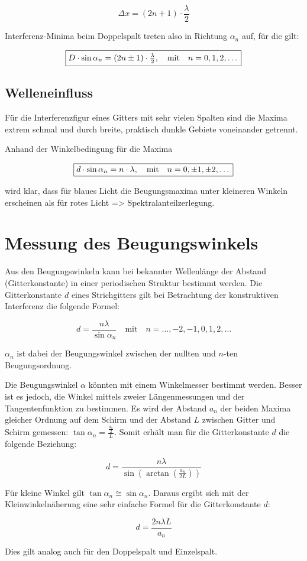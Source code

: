        $$\Delta x = (2n + 1) \cdot \frac{\lambda}{2}$$
        
        Interferenz-Minima beim Doppelspalt treten also in Richtung $\alpha_{n}$ auf, für die gilt:
        
        $$\fbox{$D \cdot \sin \alpha_{n} = (2n \pm 1) \cdot \frac{\lambda}{2}, \quad \text{mit} \quad n = 0, 1, 2, \dots$}$$
    
    \subsection{Welleneinfluss}

        Für die Interferenzfigur eines Gitters mit sehr vielen Spalten sind die Maxima extrem schmal und durch breite, praktisch dunkle Gebiete voneinander getrennt.

        Anhand der Winkelbedingung für die Maxima
        
        $$\fbox{$d \cdot \sin \alpha_{n} = n \cdot \lambda, \quad \text{mit} \quad n = 0, \pm 1, \pm 2, \dots$}$$
        
        wird klar, dass für blaues Licht die Beugungsmaxima unter kleineren Winkeln erscheinen als für rotes Licht => Spektralanteilzerlegung.

\section{Messung des Beugungswinkels}

    Aus den Beugungswinkeln kann bei bekannter Wellenlänge der Abstand (Gitterkonstante) in einer periodischen Struktur bestimmt werden. Die Gitterkonstante $d$ eines Strichgitters gilt bei Betrachtung der konstruktiven Interferenz die folgende Formel:

    $$d = \frac{n \lambda}{\sin \alpha_{n}} \quad \text{mit} \quad n = \dots, -2, -1, 0, 1, 2, \dots$$

    $\alpha_{n}$ ist dabei der Beugungswinkel zwischen der nullten und $n$-ten Beugungsordnung.

    Die Beugungswinkel $\alpha$ könnten mit einem Winkelmesser bestimmt werden. Besser ist es jedoch, die Winkel mittels zweier Längenmessungen und der Tangentenfunktion zu bestimmen. Es wird der Abstand $a_{n}$ der beiden Maxima gleicher Ordnung auf dem Schirm und der Abstand $L$ zwischen Gitter und Schirm gemessen: $\tan \alpha_{n} = \frac{\frac{a_{n}}{2}}{L}$. Somit erhält man für die Gitterkonstante $d$ die folgende Beziehung:

    $$d = \frac{n \lambda}{\sin \left(\arctan\left(\frac{a_{n}}{2 L}\right)\right)}$$

    Für kleine Winkel gilt $\tan \alpha_{n} \cong \sin \alpha_{n}$. Daraus ergibt sich mit der Kleinwinkelnäherung eine sehr einfache Formel für die Gitterkonstante $d$:

    $$d = \frac{2 n \lambda L}{a_{n}}$$

    Dies gilt analog auch für den Doppelspalt und Einzelspalt.